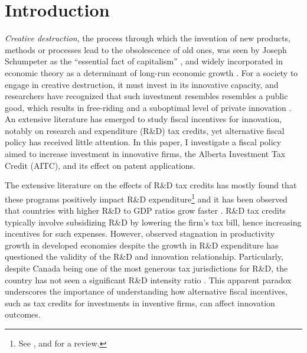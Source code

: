\documentclass[../main.tex]{subfiles}
\begin{document}
\section{Introduction}
\label{sec:introduction}

\textit{Creative destruction}, the process through which the invention of new products, methods or processes lead to the obsolescence of old ones, was seen by Joseph Schumpeter as the \enquote{essential fact of capitalism} \parencite[p.24]{caballero10}, and widely incorporated in economic theory as a determinant of long-run economic growth \parencite{aghion_howitt92, artz_etal10, jones95}. For a society to engage in creative destruction, it must invest in its innovative capacity, and researchers have recognized that such investment resembles resembles a public good, which results in free-riding and a suboptimal level of private innovation \parencite{bloom_etal19}. An extensive literature has emerged to study fiscal incentives for innovation, notably on research and expenditure (R\&D) tax credits, yet alternative fiscal policy has received little attention. In this paper, I investigate a fiscal policy aimed to increase investment in innovative firms, the Alberta Investment Tax Credit (AITC), and its effect on patent applications. 

The extensive literature on the effects of R\&D tax credits has mostly found that these programs positively impact R\&D expenditure\footnote{See \textcite{becker15}, \textcite{hall_etal10} and \textcite{hall_vanreenen00} for a review.} and it has been observed that countries with higher R\&D to GDP ratios grow faster \parencite{jones16}. R\&D tax credits typically involve subsidizing R\&D by lowering the firm's tax bill, hence increasing incentives for such expenses. However, observed stagnation in productivity growth in developed economies despite the growth in R\&D expenditure has questioned the validity of the R\&D and innovation relationship. Particularly, despite Canada being one of the most generous tax jurisdictions for R\&D, the country has not seen a significant R\&D intensity ratio \parencite{mckenzie06}. This apparent paradox underscores the importance of understanding how alternative fiscal incentives, such as tax credits for investments in inventive firms, can affect innovation outcomes.
\end{document}
